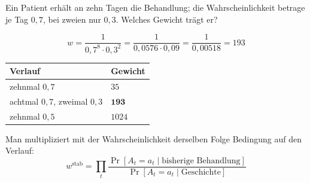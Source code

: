 \begin{aufgabe}
Ein Patient erhält an zehn Tagen die Behandlung; die Wahrscheinlichkeit betrage je Tag $0{,}7$, bei zweien nur $0{,}3$. Welches Gewicht trägt er?

\loesung
{}
\[ w = \frac{1}{0{,}7^{8}\cdot0{,}3^{2}} = \frac{1}{0{,}0576\cdot0{,}09} = \frac{1}{0{,}00518} = 193 \]

\begin{center}
{\small
\renewcommand{\arraystretch}{1.46}
\begin{tabular}{@{}P{3.4cm}P{2.4cm}@{}}
\toprule
\textbf{Verlauf} & \textbf{Gewicht}\\
\midrule
zehnmal $0{,}7$ & $35$\\
achtmal $0{,}7$, zweimal $0{,}3$ & $\mathbf{193}$\\
zehnmal $0{,}5$ & $1024$\\
\bottomrule
\end{tabular}}
\end{center}

Man multipliziert mit der Wahrscheinlichkeit derselben Folge  Bedingung auf den Verlauf:
\[ w^{\text{stab}} = \prod_t \frac{\Pr[A_t = a_t \mid \text{bisherige Behandlung}]}{\Pr[A_t = a_t \mid \text{Geschichte}]} \]

\begin{center}
\begin{minipage}{0.88\textwidth}
\end{minipage}
\end{center}
\end{aufgabe}

